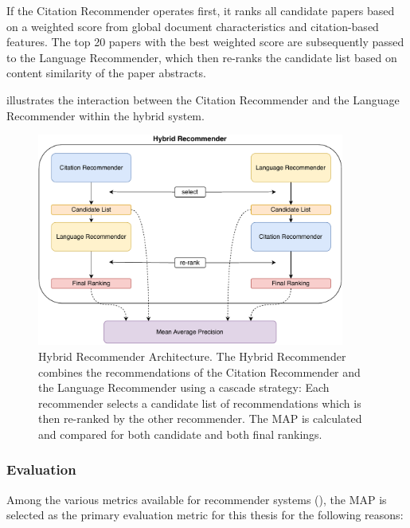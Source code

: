 If the Citation Recommender operates first, it ranks all candidate papers based on a weighted score from global document characteristics and citation-based features. The top 20 papers with the best weighted score are subsequently passed to the Language Recommender, which then re-ranks the candidate list based on content similarity of the paper abstracts.

 illustrates the interaction between the Citation Recommender and the Language Recommender within the hybrid system.

\begin{figure}[htb!]
    \centering
    \includegraphics[width=0.9\textwidth]{diagrams/hybrid-recommender.pdf}
    \caption[Hybrid Recommender]{Hybrid Recommender Architecture. The Hybrid Recommender combines the recommendations of the Citation Recommender and the Language Recommender using a cascade strategy: Each recommender selects a candidate list of recommendations which is then re-ranked by the other recommender. The \ac{MAP} is calculated and compared for both candidate and both final rankings.}
    \label{fig:hybrid-recommender}
\end{figure}


\subsubsection{Evaluation}

Among the various metrics available for recommender systems (), the \ac{MAP} is selected as the primary evaluation metric for this thesis for the following reasons:


